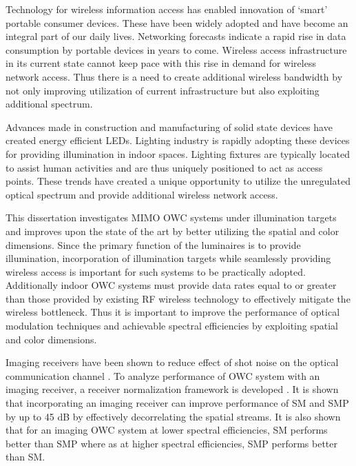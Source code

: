 Technology for wireless information access has enabled innovation of `smart' portable consumer devices. These have been widely adopted and have become an integral part of our daily lives. Networking forecasts indicate a rapid rise in data consumption by portable devices in years to come. Wireless access infrastructure in its current state cannot keep pace with this rise in demand for wireless network access. Thus there is a need to create additional wireless bandwidth by not only improving utilization of current infrastructure but also exploiting additional spectrum.

Advances made in construction and manufacturing of solid state devices have created energy efficient LEDs. Lighting industry is rapidly adopting these devices for providing illumination in indoor spaces. Lighting fixtures are typically located to assist human activities and are thus uniquely positioned to act as access points. These trends have created a unique opportunity to utilize the unregulated optical spectrum and provide additional wireless network access. 

This dissertation investigates MIMO OWC systems under illumination targets and improves upon the state of the art by better utilizing the spatial and color dimensions. Since the primary function of the luminaires is to provide illumination, incorporation of illumination targets while seamlessly providing wireless access is important for such systems to be practically adopted. Additionally indoor OWC systems must provide data rates equal to or greater than those provided by existing RF wireless technology to effectively mitigate the wireless bottleneck. Thus it is important to improve the performance of optical modulation techniques and achievable spectral efficiencies by exploiting spatial and color dimensions.

Imaging receivers have been shown to reduce effect of shot noise on the optical communication channel \cite{dja00a}. To analyze performance of OWC system with an imaging receiver, a receiver normalization framework is developed \cite{but14a}. It is shown that incorporating an imaging receiver can improve performance of SM and SMP by up to 45 dB by effectively decorrelating the spatial streams. It is also shown that for an imaging OWC system at lower spectral efficiencies, SM performs better than SMP where as at higher spectral efficiencies, SMP performs better than SM.

